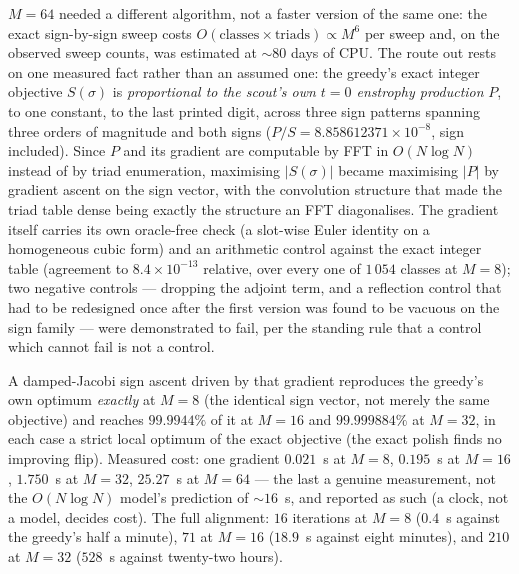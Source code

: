 \documentclass[11pt,a4paper]{article}
\theoremstyle{definition}
\theoremstyle{plain}
\begin{document}
$M=64$ needed a different algorithm, not a faster version of the same one: the exact
sign-by-sign sweep costs $O(\text{classes}\times\text{triads})\propto M^6$ per sweep and, on the
observed sweep counts, was estimated at $\sim80$ days of CPU. The route out rests on one
measured fact rather than an assumed one: the greedy's exact integer objective $S(\sigma)$ is
\emph{proportional to the scout's own $t=0$ enstrophy production} $P$, to one constant, to the
last printed digit, across three sign patterns spanning three orders of magnitude and both
signs ($P/S=8.858612371\times10^{-8}$, sign included). Since $P$ and its gradient are
computable by FFT in $O(N\log N)$ instead of by triad enumeration, maximising $|S(\sigma)|$
became maximising $|P|$ by gradient ascent on the sign vector, with the convolution structure
that made the triad table dense being exactly the structure an FFT diagonalises. The gradient
itself carries its own oracle-free check (a slot-wise Euler identity on a homogeneous cubic
form) and an arithmetic control against the exact integer table (agreement to
$8.4\times10^{-13}$ relative, over every one of $1\,054$ classes at $M=8$); two negative
controls --- dropping the adjoint term, and a reflection control that had to be redesigned once
after the first version was found to be vacuous on the sign family --- were demonstrated to
fail, per the standing rule that a control which cannot fail is not a control.

A damped-Jacobi sign ascent driven by that gradient reproduces the greedy's own optimum
\emph{exactly} at $M=8$ (the identical sign vector, not merely the same objective) and reaches
$99.9944\%$ of it at $M=16$ and $99.999884\%$ at $M=32$, in each case a strict local optimum of
the exact objective (the exact polish finds no improving flip). Measured cost: one gradient
$0.021$~s at $M=8$, $0.195$~s at $M=16$, $1.750$~s at $M=32$, $25.27$~s at $M=64$ --- the last a
genuine measurement, not the $O(N\log N)$ model's prediction of $\sim16$~s, and reported as
such (a clock, not a model, decides cost). The full alignment: $16$ iterations at $M=8$
($0.4$~s against the greedy's half a minute), $71$ at $M=16$ ($18.9$~s against eight minutes),
and $210$ at $M=32$ ($528$~s against twenty-two hours).
\end{document}
